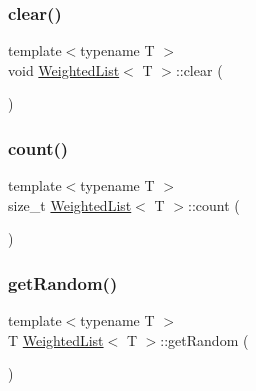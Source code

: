 \mbox{\label{class_weighted_list_aa4052758bfe1d56cd2362b5eade8accb}} 
\subsubsection{\texorpdfstring{clear()}{clear()}}
{\footnotesize\ttfamily template$<$typename T $>$ \\
void \hyperlink{class_weighted_list}{Weighted\+List}$<$ T $>$\+::clear (\begin{DoxyParamCaption}{ }\end{DoxyParamCaption})}

\mbox{\label{class_weighted_list_a81cfe8890f024d647993b69c141acbf3}} 
\subsubsection{\texorpdfstring{count()}{count()}}
{\footnotesize\ttfamily template$<$typename T $>$ \\
size\+\_\+t \hyperlink{class_weighted_list}{Weighted\+List}$<$ T $>$\+::count (\begin{DoxyParamCaption}{ }\end{DoxyParamCaption})}

\mbox{\label{class_weighted_list_afa744359c6c1f1a52d0f891e8530d34d}} 
\subsubsection{\texorpdfstring{get\+Random()}{getRandom()}}
{\footnotesize\ttfamily template$<$typename T $>$ \\
T \hyperlink{class_weighted_list}{Weighted\+List}$<$ T $>$\+::get\+Random (\begin{DoxyParamCaption}{ }\end{DoxyParamCaption})}

\mbox{\label{class_weighted_list_ab2d8cf9d843c7d9729ef81711172e855}} 
